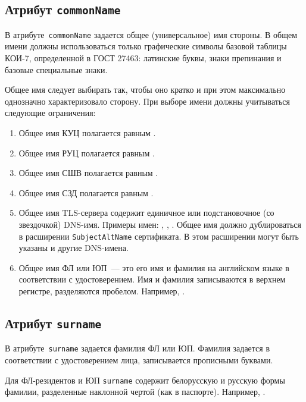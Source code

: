 
\subsection{Атрибут \texttt{commonName}}\label{ENTITIES.Id.CN}

В атрибуте~\texttt{commonName} задается общее (универсальное) имя стороны.
В общем имени должны использоваться только графические символы базовой 
таблицы КОИ-7, определенной в ГОСТ 27463: латинские буквы, 
знаки препинания и базовые специальные знаки.
 
Общее имя следует выбирать так, чтобы оно кратко 
и при этом максимально однозначно характеризовало сторону. 
При выборе имени должны учитываться следующие ограничения:
\begin{enumerate}
\item
Общее имя КУЦ полагается равным .
\item
Общее имя РУЦ полагается равным .
\item
Общее имя СШВ полагается равным .
\item
Общее имя СЗД полагается равным .
\item
Общее имя TLS-сервера содержит единичное или подстановочное (со звездочкой) 
DNS-имя. Примеры имен: , , .
%
Общее имя должно дублироваться в расширении \texttt{SubjectAltName} 
сертификата. В этом расширении могут быть указаны и другие DNS-имена.
\item
Общее имя ФЛ или ЮП~--- это его имя и фамилия на английском языке в 
соответствии с удостоверением.
Имя и фамилия записываются в верхнем регистре, разделяются пробелом.
Например, .
\end{enumerate}

\subsection{Атрибут \texttt{surname}}\label{ENTITIES.Id.S}

В атрибуте~\texttt{surname} задается фамилия ФЛ или ЮП.
Фамилия задается в соответствии с удостоверением лица,
записывается прописными буквами.

Для ФЛ-резидентов и ЮП \texttt{surname} содержит белорусскую и русскую 
формы фамилии, разделенные наклонной чертой (как в паспорте).
Например, .

